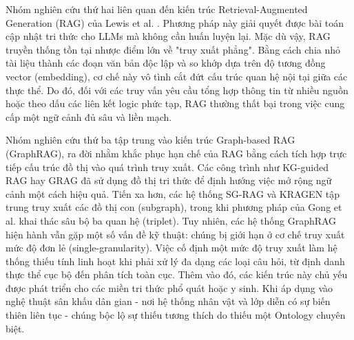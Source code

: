 Nhóm nghiên cứu thứ hai liên quan đến kiến trúc Retrieval-Augmented Generation (RAG) của Lewis et al. \cite{lewis2020retrieval}. Phương pháp này giải quyết được bài toán cập nhật tri thức cho LLMs mà không cần huấn luyện lại. Mặc dù vậy, RAG truyền thống tồn tại nhược điểm lớn về "truy xuất phẳng". Bằng cách chia nhỏ tài liệu thành các đoạn văn bản độc lập và so khớp dựa trên độ tương đồng vector (embedding), cơ chế này vô tình cắt đứt cấu trúc quan hệ nội tại giữa các thực thể. Do đó, đối với các truy vấn yêu cầu tổng hợp thông tin từ nhiều nguồn hoặc theo dấu các liên kết logic phức tạp, RAG thường thất bại trong việc cung cấp một ngữ cảnh đủ sâu và liền mạch.

Nhóm nghiên cứu thứ ba tập trung vào kiến trúc Graph-based RAG (GraphRAG), ra đời nhằm khắc phục hạn chế của RAG bằng cách tích hợp trực tiếp cấu trúc đồ thị vào quá trình truy xuất. Các công trình như KG-guided RAG \cite{zhu2025knowledge} hay GRAG \cite{hu2025grag} đã sử dụng đồ thị tri thức để định hướng việc mở rộng ngữ cảnh một cách hiệu quả. Tiến xa hơn, các hệ thống SG-RAG \cite{saleh2025sgrag} và KRAGEN \cite{matsumoto2024kragen} tập trung truy xuất các đồ thị  con (subgraph), trong khi phương pháp của Gong et al. \cite{gong2025beyond} khai thác sâu bộ ba quan hệ (triplet). Tuy nhiên, các hệ thống GraphRAG hiện hành vẫn gặp một số vấn đề kỹ thuật: chúng bị giới hạn ở cơ chế truy xuất mức độ đơn lẻ (single-granularity). Việc cố định một mức độ truy xuất làm hệ thống thiếu tính linh hoạt khi phải xử lý đa dạng các loại câu hỏi, từ định danh thực thể cục bộ đến phân tích toàn cục. Thêm vào đó, các kiến trúc này chủ yếu được phát triển cho các miền tri thức phổ quát hoặc y sinh. Khi áp dụng vào nghệ thuật sân khấu dân gian - nơi hệ thống nhân vật và lớp diễn có sự biến thiên liên tục - chúng bộc lộ sự thiếu tương thích do thiếu một Ontology chuyên biệt.


